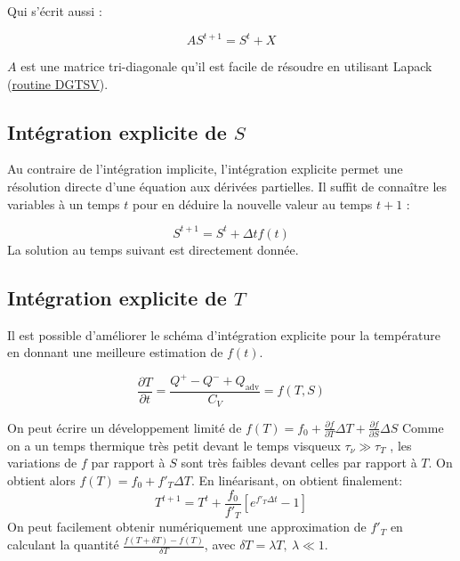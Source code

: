 Qui s'écrit aussi :

\begin{equation}
  AS^{t+1} = S^t + X 
\end{equation}

$A$ est une matrice tri-diagonale qu'il est facile de résoudre en utilisant Lapack (\href{http://www.netlib.org/lapack/explore-html/d4/d62/group__double_g_tsolve.html#ga2bf93f2ddefa5e671866eb2191dc19d4}{routine DGTSV}).

\subsection{Intégration explicite de $S$}
\label{ssec:integration_S_exp}

Au contraire de l'intégration implicite, l'intégration explicite permet une
résolution directe d'une équation aux dérivées partielles. Il suffit de
connaître les variables à un temps $t$ pour en déduire la nouvelle valeur au
temps $t+1$ :

\begin{equation}
  S^{t+1} = S^t + \Delta t f(t)
\end{equation}
La solution au temps suivant est directement donnée.

\subsection{Intégration explicite de $T$}
\label{ssec:integration_T}

Il est possible d'améliorer le schéma d'intégration explicite pour la
température en donnant une meilleure estimation de $f(t)$.

\begin{equation}
  \frac{\partial T}{\partial t} = \frac{Q^+ - Q^- + Q_\textrm{adv}}{C_V} = f(T, S)
\end{equation}

On peut écrire un développement limité de $f(T) = f_0 + \frac{\partial
f}{\partial T}\Delta T + \frac{\partial f}{\partial S}\Delta S$ Comme on a un
temps thermique très petit devant le temps visqueux $\tau_\nu \gg \tau_T$
 , les variations de $f$ par rapport à $S$ sont
très faibles devant celles par rapport à $T$. On obtient alors $f(T) = f_0 +
f'_T \Delta T$. En linéarisant, on obtient finalement: \begin{equation} T^{t+1}
= T^t + \frac{f_0}{f'_T}\left[e^{f'_T\Delta t} - 1 \right] \end{equation} On
peut facilement obtenir numériquement une approximation de $f'_T$ en calculant
la quantité $\frac{f(T+\delta T) - f(T)}{\delta T}$, avec $\delta T = \lambda
T,\ \lambda \ll 1$.

